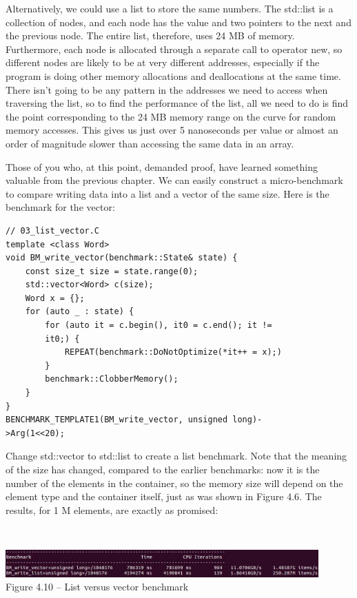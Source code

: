Alternatively, we could use a list to store the same numbers. The std::list is a collection of nodes, and each node has the value and two pointers to the next and the previous node. The entire list, therefore, uses 24 MB of memory. Furthermore, each node is allocated through a separate call to operator new, so different nodes are likely to be at very different addresses, especially if the program is doing other memory allocations and deallocations at the same time. There isn't going to be any pattern in the addresses we need to access when traversing the list, so to find the performance of the list, all we need to do is find the point corresponding to the 24 MB memory range on the curve for random memory accesses. This gives us just over 5 nanoseconds per value or almost an order of magnitude slower than accessing the same data in an array.

Those of you who, at this point, demanded proof, have learned something valuable from the previous chapter. We can easily construct a micro-benchmark to compare writing data into a list and a vector of the same size. Here is the benchmark for the vector:

\begin{lstlisting}[style=styleCXX]
// 03_list_vector.C
template <class Word>
void BM_write_vector(benchmark::State& state) {
	const size_t size = state.range(0);
	std::vector<Word> c(size);
	Word x = {};
	for (auto _ : state) {
		for (auto it = c.begin(), it0 = c.end(); it !=
		it0;) {
			REPEAT(benchmark::DoNotOptimize(*it++ = x);)
		}
		benchmark::ClobberMemory();
	}
}
BENCHMARK_TEMPLATE1(BM_write_vector, unsigned long)-
>Arg(1<<20);
\end{lstlisting}

Change std::vector to std::list to create a list benchmark. Note that the meaning of the size has changed, compared to the earlier benchmarks: now it is the number of the elements in the container, so the memory size will depend on the element type and the container itself, just as was shown in Figure 4.6. The results, for 1 M elements, are exactly as promised:

\hspace*{\fill} \\ %
\begin{center}
\includegraphics[width=0.9\textwidth]{content/1/chapter4/images/10.jpg}\\
Figure 4.10 – List versus vector benchmark
\end{center}

